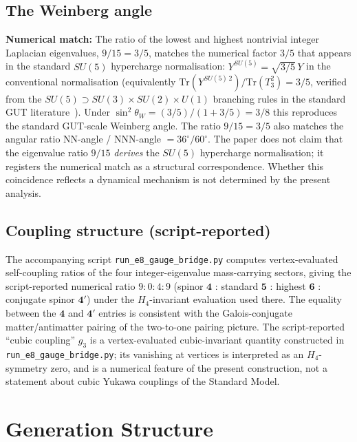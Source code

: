\documentclass[12pt]{article}
\begin{document}
\subsection{The Weinberg angle}

\textbf{Numerical match:} The ratio of the lowest and highest nontrivial integer Laplacian eigenvalues, $9/15 = 3/5$, matches the numerical factor $3/5$ that appears in the standard $SU(5)$ hypercharge normalisation: $Y^{SU(5)} = \sqrt{3/5}\,Y$ in the conventional normalisation (equivalently $\mathrm{Tr}(Y^{SU(5)\,2})/\mathrm{Tr}(T_3^2) = 3/5$, verified from the $SU(5) \supset SU(3) \times SU(2) \times U(1)$ branching rules in the standard GUT literature~\citep{GeorgiGlashow1974, Langacker1981}). Under $\sin^2 \theta_W = (3/5)/(1 + 3/5) = 3/8$ this reproduces the standard GUT-scale Weinberg angle. The ratio $9/15 = 3/5$ also matches the angular ratio NN-angle / NNN-angle $= 36^\circ / 60^\circ$. The paper does not claim that the eigenvalue ratio $9/15$ \emph{derives} the $SU(5)$ hypercharge normalisation; it registers the numerical match as a structural correspondence. Whether this coincidence reflects a dynamical mechanism is not determined by the present analysis.

\subsection{Coupling structure (script-reported)}

The accompanying script \texttt{run\_e8\_gauge\_bridge.py} computes vertex-evaluated self-coupling ratios of the four integer-eigenvalue mass-carrying sectors, giving the script-reported numerical ratio $9 : 0 : 4 : 9$ (spinor $\mathbf{4}$ : standard $\mathbf{5}$ : highest $\mathbf{6}$ : conjugate spinor $\mathbf{4'}$) under the $H_4$-invariant evaluation used there. The equality between the $\mathbf{4}$ and $\mathbf{4'}$ entries is consistent with the Galois-conjugate matter/antimatter pairing of the two-to-one pairing picture. The script-reported ``cubic coupling'' $g_3$ is a vertex-evaluated cubic-invariant quantity constructed in \texttt{run\_e8\_gauge\_bridge.py}; its vanishing at vertices is interpreted as an $H_4$-symmetry zero, and is a numerical feature of the present construction, not a statement about cubic Yukawa couplings of the Standard Model.

\section{Generation Structure}\label{sec:generations}
\end{document}
